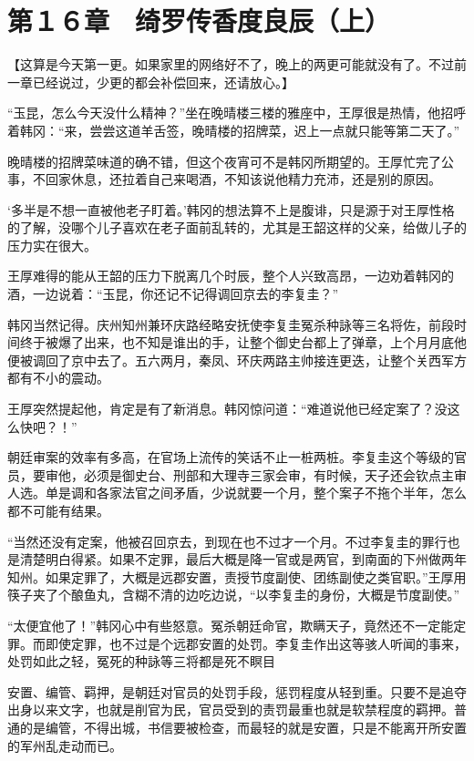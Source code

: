\section{第１６章　绮罗传香度良辰（上）}

【这算是今天第一更。如果家里的网络好不了，晚上的两更可能就没有了。不过前一章已经说过，少更的都会补偿回来，还请放心。】

“玉昆，怎么今天没什么精神？”坐在晚晴楼三楼的雅座中，王厚很是热情，他招呼着韩冈：“来，尝尝这道羊舌签，晚晴楼的招牌菜，迟上一点就只能等第二天了。”

晚晴楼的招牌菜味道的确不错，但这个夜宵可不是韩冈所期望的。王厚忙完了公事，不回家休息，还拉着自己来喝酒，不知该说他精力充沛，还是别的原因。

‘多半是不想一直被他老子盯着。’韩冈的想法算不上是腹诽，只是源于对王厚性格的了解，没哪个儿子喜欢在老子面前乱转的，尤其是王韶这样的父亲，给做儿子的压力实在很大。

王厚难得的能从王韶的压力下脱离几个时辰，整个人兴致高昂，一边劝着韩冈的酒，一边说着：“玉昆，你还记不记得调回京去的李复圭？”

韩冈当然记得。庆州知州兼环庆路经略安抚使李复圭冤杀种詠等三名将佐，前段时间终于被爆了出来，也不知是谁出的手，让整个御史台都上了弹章，上个月月底他便被调回了京中去了。五六两月，秦凤、环庆两路主帅接连更迭，让整个关西军方都有不小的震动。

王厚突然提起他，肯定是有了新消息。韩冈惊问道：“难道说他已经定案了？没这么快吧？！”

朝廷审案的效率有多高，在官场上流传的笑话不止一桩两桩。李复圭这个等级的官员，要审他，必须是御史台、刑部和大理寺三家会审，有时候，天子还会钦点主审人选。单是调和各家法官之间矛盾，少说就要一个月，整个案子不拖个半年，怎么都不可能有结果。

“当然还没有定案，他被召回京去，到现在也不过才一个月。不过李复圭的罪行也是清楚明白得紧。如果不定罪，最后大概是降一官或是两官，到南面的下州做两年知州。如果定罪了，大概是远郡安置，责授节度副使、团练副使之类官职。”王厚用筷子夹了个酿鱼丸，含糊不清的边吃边说，“以李复圭的身份，大概是节度副使。”

“太便宜他了！”韩冈心中有些怒意。冤杀朝廷命官，欺瞒天子，竟然还不一定能定罪。而即使定罪，也不过是个远郡安置的处罚。李复圭作出这等骇人听闻的事来，处罚如此之轻，冤死的种詠等三将都是死不瞑目

安置、编管、羁押，是朝廷对官员的处罚手段，惩罚程度从轻到重。只要不是追夺出身以来文字，也就是削官为民，官员受到的责罚最重也就是软禁程度的羁押。普通的是编管，不得出城，书信要被检查，而最轻的就是安置，只是不能离开所安置的军州乱走动而已。

